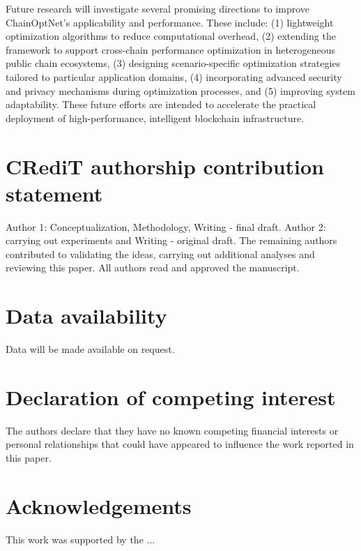 \documentclass[a4paper,fleqn]{cas-dc}
\begin{document}
Future research will investigate several promising directions to improve ChainOptNet's applicability and performance. These include: (1) lightweight optimization algorithms to reduce computational overhead, (2) extending the framework to support cross-chain performance optimization in heterogeneous public chain ecosystems, (3) designing scenario-specific optimization strategies tailored to particular application domains, (4) incorporating advanced security and privacy mechanisms during optimization processes, and (5) improving system adaptability. These future efforts are intended to accelerate the practical deployment of high-performance, intelligent blockchain infrastructure.















%


\section*{CRediT authorship contribution statement}

Author 1: Conceptualization, Methodology, Writing -
final draft. Author 2: carrying out experiments and
Writing - original draft. The remaining authors contributed
to validating the ideas, carrying out additional analyses and
reviewing this paper. All authors read and approved the
manuscript.

\section*{Data availability}

Data will be made available on request.

\section*{Declaration of competing interest}

The authors declare that they have no known competing financial interests or personal relationships that could have appeared to influence the work reported in this paper.

\section*{Acknowledgements}
This work was supported by the ...



\end{document}
